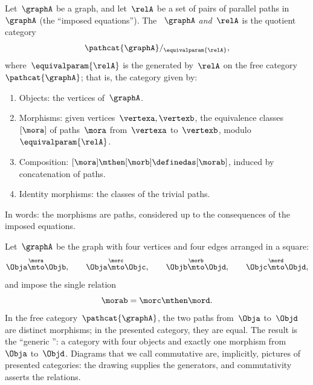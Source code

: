 \begin{ctdefinition}
    \label{def:presented-category}
    Let~$\graphA$ be a graph, and let~$\relA$ be a set of pairs of parallel paths in~$\graphA$ (the ``imposed equations'').
    The ~$\graphA$ \emph{and}~$\relA$ is the quotient category
    \begin{equation}
        \pathcat{\graphA} /_{\equivalparam{\relA}},
    \end{equation}
    where~$\equivalparam{\relA}$ is the  generated by~$\relA$ on the free category $\pathcat{\graphA}$; that is, the category given by:

    \constit

    \begin{enumerate}
        \item Objects: the vertices of~$\graphA$.
        \item Morphisms: given vertices~$\vertexa, \vertexb$, the equivalence classes~$[\mora]$ of paths~$\mora$ from~$\vertexa$ to~$\vertexb$, modulo~$\equivalparam{\relA}$.
        \item Composition: $[\mora] \mthen [\morb] \definedas [\morab]$, induced by concatenation of paths.
        \item Identity morphisms: the classes of the trivial paths.
    \end{enumerate}

    In words: the morphisms are paths, considered up to the consequences of the imposed equations.
\end{ctdefinition}

\begin{example}
    \label{exa:presented-commutative-square}
    Let~$\graphA$ be the graph with four vertices and four edges arranged in a square:
    \begin{equation}
        \Obja \overset{\mora}{\mto} \Objb, \qquad
        \Obja \overset{\morc}{\mto} \Objc, \qquad
        \Objb \overset{\morb}{\mto} \Objd, \qquad
        \Objc \overset{\mord}{\mto} \Objd,
    \end{equation}
    and impose the single relation
    \begin{equation}
        \morab = \morc \mthen \mord.
    \end{equation}
    In the free category~$\pathcat{\graphA}$, the two paths from~$\Obja$ to~$\Objd$ are distinct morphisms; in the presented category, they are equal.
    The result is the ``generic '': a category with four objects and exactly one morphism from~$\Obja$ to~$\Objd$.
    Diagrams that we call commutative are, implicitly, pictures of presented categories: the drawing supplies the generators, and commutativity asserts the relations.
\end{example}

